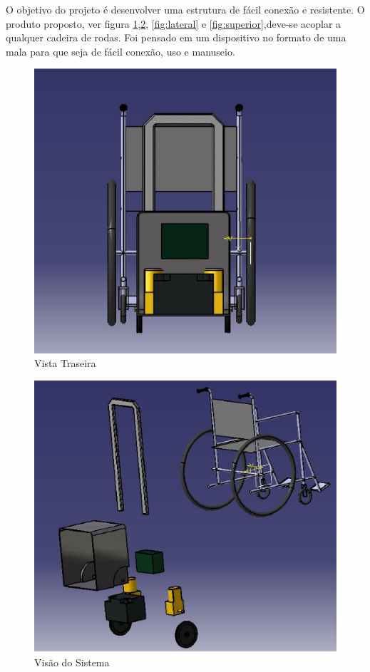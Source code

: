 O objetivo do projeto é desenvolver uma estrutura de fácil conexão e resistente. O produto proposto, ver figura \ref{fig:traseira},\ref{fig:sistema}, \ref{fig:lateral} e \ref{fig:superior},deve-se acoplar a qualquer cadeira de rodas. Foi pensado em um dispositivo no formato de uma mala para que seja de fácil conexão, uso e manuseio.

\begin{figure}[!htb]
\centering
\includegraphics[keepaspectratio=true,scale=0.4]{figuras/estrutura/vista_traseira}
\caption{Vista Traseira}
\label{fig:traseira}
\end{figure}

\begin{figure}[!htb]
\centering
\includegraphics[keepaspectratio=true,scale=0.4]{figuras/estrutura/explode}
\caption{Visão do Sistema}
\label{fig:sistema}
\end{figure}

